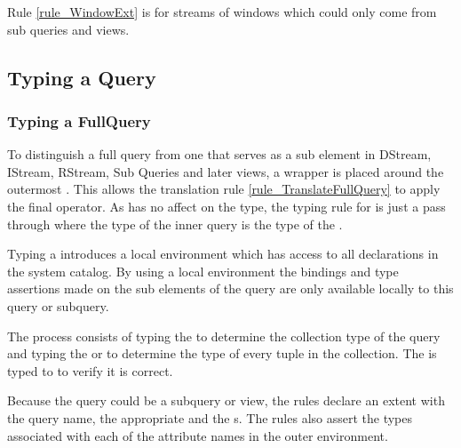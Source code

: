 Rule \ref{rule_WindowExt} is for streams of windows which could only come from sub queries and views.


\subsection{Typing a Query}
\label{sec_wholeQueryType}

\subsubsection{Typing a FullQuery}

To distinguish a full query from one that serves as a sub element in DStream, IStream, RStream, Sub Queries and later views, a  wrapper is placed around the outermost . 
This allows the translation rule \ref{rule_TranslateFullQuery} to apply the final  operator.
As  has no affect on the type, the typing rule for  is just a pass through where the type of the inner query is the type of the .

Typing a  introduces a local environment which has access to
all declarations in the system catalog.  By using a local environment the bindings and type assertions 
made on the sub elements of the query are only available locally to this query or subquery.

The process consists of
typing the  to determine the collection type of the
query and typing the  or  to
determine the type of every tuple in the collection.  The 
is typed to  to verify it is correct.  

Because the query could be a subquery or view, the rules declare an extent with the query name, the appropriate  and the s.
The  rules also assert the types associated with each of the attribute names in the outer environment.

